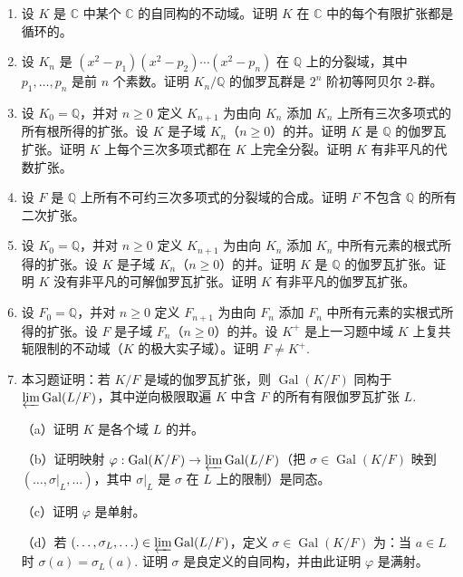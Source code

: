 \begin{enumerate}
（d）由此证明 \([\mathbb{C}:K]\) 是可数的（且不是有限的）。

\item 设 \(K\) 是 \(\mathbb{C}\) 中某个 \(\mathbb{C}\) 的自同构的不动域。证明 \(K\) 在 \(\mathbb{C}\) 中的每个有限扩张都是循环的。

\item 设 \(K_n\) 是 \((x^2-p_1)(x^2-p_2)\cdots(x^2-p_n)\) 在 \(\mathbb{Q}\) 上的分裂域，其中 \(p_1, \ldots, p_n\) 是前 \(n\) 个素数。证明 \(K_n/\mathbb{Q}\) 的伽罗瓦群是 \(2^n\) 阶初等阿贝尔 2-群。

\item 设 \(K_0 = \mathbb{Q}\)，并对 \(n \geq 0\) 定义 \(K_{n+1}\) 为由向 \(K_n\) 添加 \(K_n\) 上所有三次多项式的所有根所得的扩张。设 \(K\) 是子域 \(K_n\)（\(n \geq 0\)）的并。证明 \(K\) 是 \(\mathbb{Q}\) 的伽罗瓦扩张。证明 \(K\) 上每个三次多项式都在 \(K\) 上完全分裂。证明 \(K\) 有非平凡的代数扩张。

\item 设 \(F\) 是 \(\mathbb{Q}\) 上所有不可约三次多项式的分裂域的合成。证明 \(F\) 不包含 \(\mathbb{Q}\) 的所有二次扩张。

\item 设 \(K_0 = \mathbb{Q}\)，并对 \(n \geq 0\) 定义 \(K_{n+1}\) 为由向 \(K_n\) 添加 \(K_n\) 中所有元素的根式所得的扩张。设 \(K\) 是子域 \(K_n\)（\(n \geq 0\)）的并。证明 \(K\) 是 \(\mathbb{Q}\) 的伽罗瓦扩张。证明 \(K\) 没有非平凡的可解伽罗瓦扩张。证明 \(K\) 有非平凡的伽罗瓦扩张。

\item 设 \(F_0 = \mathbb{Q}\)，并对 \(n \geq 0\) 定义 \(F_{n+1}\) 为由向 \(F_n\) 添加 \(F_n\) 中所有元素的实根式所得的扩张。设 \(F\) 是子域 \(F_n\)（\(n \geq 0\)）的并。设 \(K^+\) 是上一习题中域 \(K\) 上复共轭限制的不动域（\(K\) 的极大实子域）。证明 \(F \neq K^+\).

\item 本习题证明：若 \(K/F\) 是域的伽罗瓦扩张，则 \(\operatorname{Gal}(K/F)\) 同构于 \(\varprojlim \operatorname{Gal}(L/F)\)，其中逆向极限取遍 \(K\) 中含 \(F\) 的所有有限伽罗瓦扩张 \(L\).

（a）证明 \(K\) 是各个域 \(L\) 的并。

（b）证明映射 \(\varphi : \operatorname{Gal}(K/F) \to \varprojlim \operatorname{Gal}(L/F)\)（把 \(\sigma \in \operatorname{Gal}(K/F)\) 映到 \((\ldots, \sigma|_L, \ldots)\)，其中 \(\sigma|_L\) 是 \(\sigma\) 在 \(L\) 上的限制）是同态。

（c）证明 \(\varphi\) 是单射。

（d）若 \((\ldots, \sigma_L, \ldots) \in \varprojlim \operatorname{Gal}(L/F)\)，定义 \(\sigma \in \operatorname{Gal}(K/F)\) 为：当 \(a \in L\) 时 \(\sigma(a) = \sigma_L(a)\). 证明 \(\sigma\) 是良定义的自同构，并由此证明 \(\varphi\) 是满射。
\end{enumerate}
